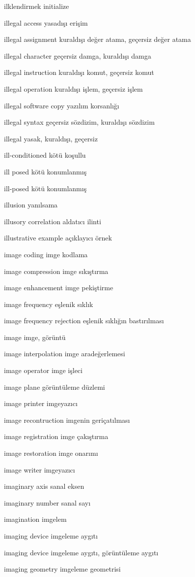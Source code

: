 \documentclass[12pt,fleqn]{article}\usepackage{../../common}
\begin{document}
ilklendirmek initialize

illegal access yasadışı erişim

illegal assignment kuraldışı değer atama, geçersiz değer atama

illegal character geçersiz damga, kuraldışı damga

illegal instruction kuraldışı komut, geçersiz komut

illegal operation kuraldışı işlem, geçersiz işlem

illegal software copy yazılım korsanlığı

illegal syntax geçersiz sözdizim, kuraldışı sözdizim

illegal yasak, kuraldışı, geçersiz

ill-conditioned kötü koşullu

ill posed kötü konumlanmış

ill-posed kötü konumlanmış

illusion yanılsama

illusory correlation aldatıcı ilinti

illustrative example açıklayıcı örnek

image coding imge kodlama

image compression imge sıkıştırma

image enhancement imge pekiştirme

image frequency eşlenik sıklık

image frequency rejection eşlenik sıklığın bastırılması

image imge, görüntü

image interpolation imge aradeğerlemesi

image operator imge işleci

image plane görüntüleme düzlemi

image printer imgeyazıcı

image recontruction imgenin geriçatılması

image registration imge çakıştırma

image restoration imge onarımı

image writer imgeyazıcı

imaginary axis sanal eksen

imaginary number sanal sayı

imagination imgelem

imaging device imgeleme aygıtı

imaging device imgeleme aygıtı, görüntüleme aygıtı

imaging geometry imgeleme geometrisi
\end{document}
